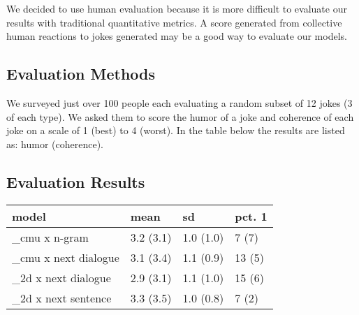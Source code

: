 \documentclass[twoside,twocolumn]{article}
\begin{document}
We decided to use human evaluation because it is more difficult to evaluate our results with traditional quantitative metrics. A score generated from collective human reactions to jokes generated may be a good way to evaluate our models.

\subsection{Evaluation Methods}

We surveyed just over 100 people each evaluating a random subset of 12 jokes (3 of each type). We asked them to score the humor of a joke and coherence of each joke on a scale of 1 (best) to 4 (worst). In the table below the results are listed as: humor (coherence).

\subsection{Evaluation Results}



\begin{center}
    \begin{tabular}{ p{2.0cm} | p{1.2cm}| p{1.2cm} | p{0.9cm} }
    model & mean & sd & pct. 1 \\
    \hline
    \_cmu x n-gram & 3.2 (3.1) & 1.0 (1.0) & 7 (7) \\ 
    \hline
    \_cmu x next dialogue & 3.1 (3.4) & 1.1 (0.9) & 13 (5) \\ 
    \hline
    \_2d x next dialogue & 2.9 (3.1) & 1.1 (1.0) & 15 (6) \\ 
    \hline
    \_2d x next sentence & 3.3 (3.5) & 1.0 (0.8) & 7 (2) \\ 
    \end{tabular}
\end{center}
    
    


\end{document}
